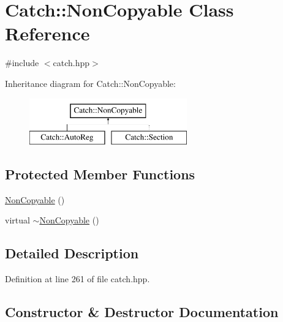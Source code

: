 \hypertarget{class_catch_1_1_non_copyable}{}\section{Catch\+:\+:Non\+Copyable Class Reference}
\label{class_catch_1_1_non_copyable}


{\ttfamily \#include $<$catch.\+hpp$>$}

Inheritance diagram for Catch\+:\+:Non\+Copyable\+:\begin{figure}[H]
\begin{center}
\leavevmode
\includegraphics[height=2.000000cm]{class_catch_1_1_non_copyable}
\end{center}
\end{figure}
\subsection*{Protected Member Functions}
\begin{DoxyCompactItemize}
\item 
\mbox{\hyperlink{class_catch_1_1_non_copyable_a4b492dd5753f9952350fb64dc6cb9fe2}{Non\+Copyable}} ()
\item 
virtual \mbox{\hyperlink{class_catch_1_1_non_copyable_a81254677280fef337eb4a676e91e3293}{$\sim$\+Non\+Copyable}} ()
\end{DoxyCompactItemize}


\subsection{Detailed Description}


Definition at line 261 of file catch.\+hpp.



\subsection{Constructor \& Destructor Documentation}
\mbox{\label{class_catch_1_1_non_copyable_a4b492dd5753f9952350fb64dc6cb9fe2}} 
